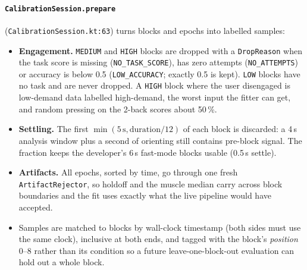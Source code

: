 \documentclass[10pt,a4paper]{article}
\newcommand{\file}[1]{\texttt{\small #1}}          %
\newcommand{\code}[1]{\texttt{#1}}                  %
\begin{document}
\paragraph{\code{CalibrationSession.prepare}} (\file{CalibrationSession.kt:63}) turns blocks and
epochs into labelled samples:
\begin{itemize}
\item \textbf{Engagement.} \code{MEDIUM} and \code{HIGH} blocks are dropped with a
  \code{DropReason} when the task score is missing (\code{NO\_TASK\_SCORE}), has zero attempts
  (\code{NO\_ATTEMPTS}) or accuracy is below 0.5 (\code{LOW\_ACCURACY}; exactly 0.5 is kept).
  \code{LOW} blocks have no task and are never dropped. A \code{HIGH} block where the user
  disengaged is low-demand data labelled high-demand, the worst input the fitter can get, and
  random pressing on the 2-back scores about 50\,\%.
\item \textbf{Settling.} The first $\min(5\,\text{s}, \text{duration}/12)$ of each block is
  discarded: a 4\,s analysis window plus a second of orienting still contains pre-block signal.
  The fraction keeps the developer's 6\,s fast-mode blocks usable (0.5\,s settle).
\item \textbf{Artifacts.} All epochs, sorted by time, go through one fresh \code{ArtifactRejector},
  so holdoff and the muscle median carry across block boundaries and the fit uses exactly what the
  live pipeline would have accepted.
\item Samples are matched to blocks by wall-clock timestamp (both sides must use the same
  clock), inclusive at both ends, and tagged with the block's
  \emph{position} 0--8 rather than its condition so a future leave-one-block-out evaluation can hold
  out a whole block.
\end{itemize}
\end{document}

